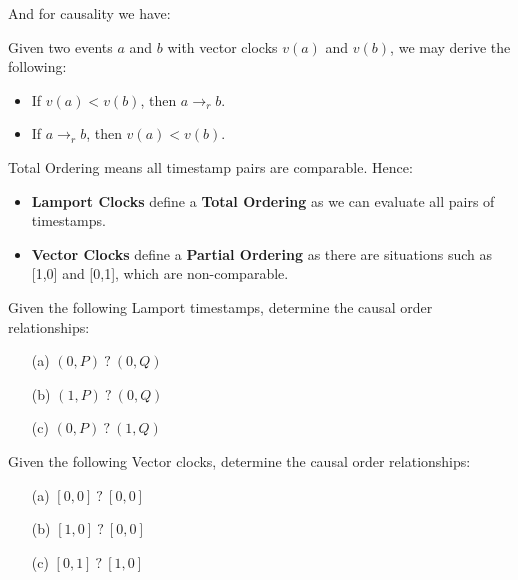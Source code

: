 \noindent
And for causality we have:
\begin{theo}

    Given two events $a$ and $b$ with vector clocks $v(a)$ and $v(b)$, we may derive the following:
    \begin{itemize}
        \item If $v(a) < v(b)$, then $a \rightarrow_r b$.
        \item If $a \rightarrow_r b$, then $v(a) < v(b)$.
    \end{itemize}
\end{theo}

\begin{theo}

    Total Ordering means all timestamp pairs are comparable. Hence:
    \begin{itemize}
        \item \textbf{Lamport Clocks} define a \textbf{Total Ordering} as we can evaluate all pairs of timestamps.
        \item \textbf{Vector Clocks} define a \textbf{Partial Ordering} as there are situations such as [1,0] and [0,1], which are 
        non-comparable.
    \end{itemize} 
\end{theo}
 \newpage 

\begin{Exercise} Given the following Lamport timestamps, determine the causal order relationships:

    \begin{itemize}
        \item[(a)] $(0,P)\ ?\ (0,Q)$
        \item[(b)] $(1,P)\ ?\ (0,Q)$
        \item[(c)] $(0,P)\ ?\ (1,Q)$
    \end{itemize}
\end{Exercise}

\begin{Exercise} Given the following Vector clocks, determine the causal order relationships:

    \begin{itemize}
        \item[(a)] $[0,0]\ ?\ [0,0]$
        \item[(b)] $[1,0]\ ?\ [0,0]$
        \item[(c)] $[0,1]\ ?\ [1,0]$
    \end{itemize}
\end{Exercise}

